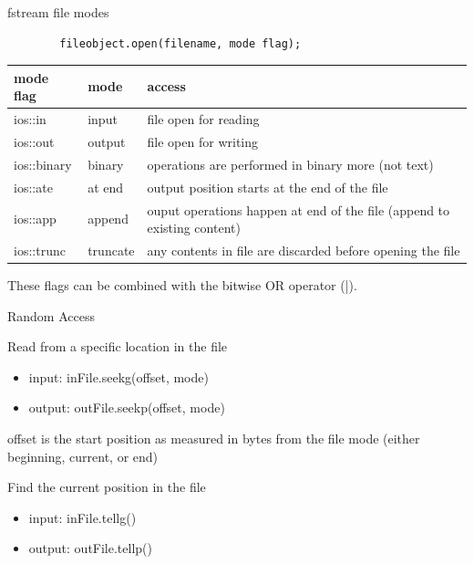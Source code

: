 \documentclass[xcolor={dvipsnames}]{beamer}
\begin{document}
\begin{frame}[fragile]{fstream file modes}
	\begin{center}
	\begin{verbatim}
		fileobject.open(filename, mode flag);
	\end{verbatim}
	\end{center}
\begin{table}
\begin{tabular}{|l|l|p{5cm}|}
	\hline
	\textbf{mode flag} & \textbf{mode} & {access}\\
	\hline
	ios::in & input & file open for reading \\
	\hline
	ios::out & output & file open for writing\\
	\hline
	ios::binary & binary & operations are performed in binary more (not text)\\
	\hline
	ios::ate & at end & output position starts at the end of the file \\
	\hline
	ios::app & append & ouput operations happen at end of the file (append to existing content)\\
	\hline
	ios::trunc & truncate & any contents in file are discarded before opening the file\\
	\hline
\end{tabular}
\end{table}
These flags can be combined with the bitwise OR operator (|).
\end{frame}

\begin{frame}{Random Access}
	\begin{block}{Read from a specific location in the file}
			\begin{itemize}
				\item input: inFile.seekg(offset, mode)
				\item output: outFile.seekp(offset, mode)
			\end{itemize}
		offset is the start position as measured in bytes from the file mode (either beginning, current, or end)
	\end{block}
	\begin{block}{Find the current position in the file}
			\begin{itemize}
				\item input: inFile.tellg()
				\item output: outFile.tellp()
			\end{itemize}
	\end{block}
	
\end{frame}
\end{document}
